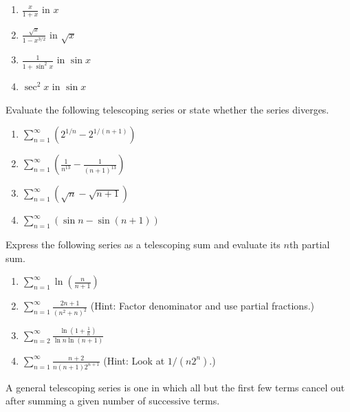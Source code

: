 \documentclass{exercises}
\begin{document}
\begin{enumerate}[resume]
\item $\frac{x}{1+x}$ in $x$
\item $\frac{\sqrt{x}}{1-x^{3/2}}$ in $\sqrt{x}$
\item $\frac{1}{1+\sin^{2}x}$ in $\sin x$
\item $\sec^{2}x$ in $\sin x$
\end{enumerate}

Evaluate the following telescoping series or state whether the series diverges.

\begin{enumerate}[resume]
\item $\sum_{n=1}^{\infty}(2^{1/n}-2^{1/(n+1)})$
\item $\sum_{n=1}^{\infty}(\frac{1}{n^{13}}-\frac{1}{{(n+1)}^{13}})$
\item $\sum_{n=1}^{\infty}(\sqrt{n}-\sqrt{n+1})$
\item $\sum_{n=1}^{\infty}(\sin n-\sin(n+1))$
\end{enumerate}

Express the following series as a telescoping sum and evaluate its $n$th partial sum.

\begin{enumerate}[resume]
\item $\sum_{n=1}^{\infty}\ln(\frac{n}{n+1})$
\item $\sum_{n=1}^{\infty}\frac{2n+1}{{(n^{2}+n)}^{2}}$ (Hint: Factor denominator and use partial fractions.)
\item $\sum_{n=2}^{\infty}\frac{\ln(1+\frac{1}{n})}{\ln n\ln(n+1)}$
\item $\sum_{n=1}^{\infty}\frac{n+2}{n(n+1)2^{n+1}}$ (Hint: Look at $1/(n2^{n})$.)
\end{enumerate}

A general telescoping series is one in which all but the first few terms cancel out after summing a given number of successive terms.
\end{document}
